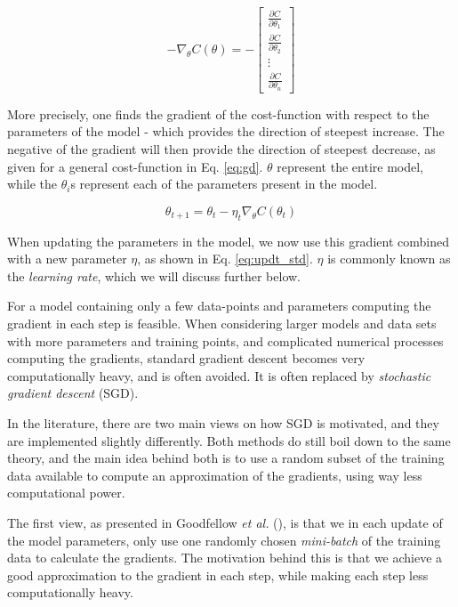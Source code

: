 \begin{equation}\label{eq:gd}
    -\nabla_\theta C(\theta) = -\begin{bmatrix}
\frac{\partial C}{\partial \theta_1} \\
\frac{\partial C}{\partial \theta_2} \\
\vdots \\
\frac{\partial C}{\partial \theta_n}
\end{bmatrix}
\end{equation}

More precisely, one finds the gradient of the cost-function with respect to the parameters of the model - which provides the direction of steepest increase. The negative of the gradient will then provide the direction of steepest decrease, as given for a general cost-function in Eq. \ref{eq:gd}. $\theta$ represent the entire model, while the $\theta_i$s represent each of the parameters present in the model.

\begin{equation}\label{eq:updt_std}
    \theta_{t+1} = \theta_t - \eta_t \nabla_{\theta} C(\theta_t)
\end{equation}

When updating the parameters in the model, we now use this gradient combined with a new parameter $\eta$, as shown in Eq. \ref{eq:updt_std}.
$\eta$ is commonly known as the \textit{learning rate}, which we will discuss further below.

For a model containing only a few data-points and parameters computing the gradient in each step is feasible.
When considering larger models and data sets with more parameters and training points, and complicated numerical processes computing the gradients, standard gradient descent becomes very computationally heavy, and is often avoided.
It is often replaced by \textit{stochastic gradient descent} (SGD).

In the literature, there are two main views on how SGD is motivated, and they are implemented slightly differently.
Both methods do still boil down to the same theory, and the main idea behind both is to use a random subset of the training data available to compute an approximation of the gradients, using way less computational power.

The first view, as presented in Goodfellow \textit{et al.} (\citeyear[p. 291]{Goodfellow-et-al-2016}), is that we in each update of the model parameters, only use one randomly chosen \textit{mini-batch} of the training data to calculate the gradients.
The motivation behind this is that we achieve a good approximation to the gradient in each step, while making each step less computationally heavy.


